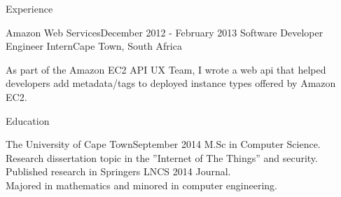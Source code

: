 \documentclass{resume} %
\begin{document}
\begin{rSection}{Experience}
\begin{rSubsection}
        \end{rSubsection}

        \begin{rSubsection}
            {Amazon Web Services}{December 2012 - February 2013}
            {Software Developer Engineer Intern}{Cape Town, South Africa}
            
            \item As part of the Amazon EC2 API UX Team, I wrote a web api that helped 
                developers add metadata/tags to deployed instance types offered by Amazon EC2.
                
        \end{rSubsection}

    \end{rSection}

    
    \begin{rSection}{Education}


        \begin{rSubsection}
            {The University of Cape Town}{September 2014}{}{}
            M.Sc in Computer Science. \\
            Research dissertation topic in the ”Internet of The Things” and security. \\
            Published research in Springers LNCS 2014 Journal. \\
            Majored in mathematics and minored in computer engineering. \\
                
        \end{rSubsection}

    \end{rSection}
\end{document}
